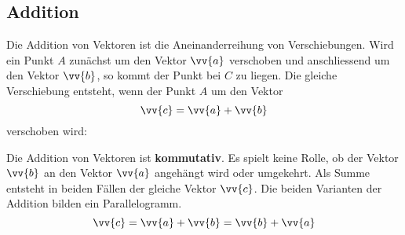 \newpage
\subsection{Addition}

Die Addition von Vektoren ist die Aneinanderreihung von Verschiebungen. Wird ein Punkt $A$ zunächst um den Vektor $\vv{a}$ verschoben und anschliessend um den Vektor $\vv{b}$, so kommt der Punkt bei $C$ zu liegen. Die gleiche Verschiebung entsteht, wenn der Punkt $A$ um den Vektor
\[
  \vv{c} = \vv{a} + \vv{b}
\]
verschoben wird:
\begin{center}
\end{center}

Die Addition von Vektoren ist \textbf{kommutativ}. Es spielt keine Rolle, ob der Vektor $\vv{b}$ an den Vektor $\vv{a}$ angehängt wird oder umgekehrt. Als Summe entsteht in beiden Fällen der gleiche Vektor $\vv{c}$. Die beiden Varianten der Addition bilden ein Parallelogramm.
\[
  \vv{c} = \vv{a} + \vv{b} = \vv{b} + \vv{a}
\]
\begin{center}
\end{center}

